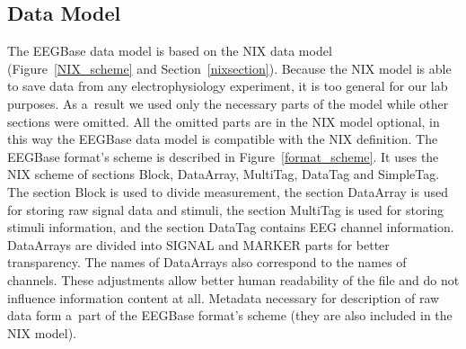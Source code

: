 \documentclass[conference]{IEEEtran}
\begin{document}
\subsection{Data Model}
\label{section_data}
The EEGBase data model is based on the NIX data model (Figure~\ref{NIX_scheme} and Section~\ref{nixsection}). Because the NIX model is able to save data from any electrophysiology experiment, it is  too general for our lab purposes. As a~result we used only the necessary parts of the model while other sections were omitted. All the omitted parts are in the NIX model optional, in this way the EEGBase data model is compatible with the NIX definition. The EEGBase format's scheme is described in Figure~\ref{format_scheme}. It uses the NIX scheme of sections Block, DataArray, MultiTag, DataTag and SimpleTag. The section Block is used to divide measurement, the section DataArray is used for storing raw signal data and stimuli, the section MultiTag is used for storing stimuli information, and the section DataTag contains EEG channel information. DataArrays are divided into SIGNAL and MARKER parts for better transparency. The names of DataArrays also correspond to the names of channels. These adjustments allow better human readability of the file and do not influence information content at all. Metadata necessary for description of raw data form a~part of the EEGBase format's scheme (they are also included in the NIX model).
\end{document}
